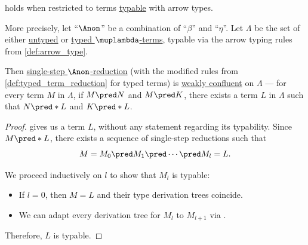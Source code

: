 \begin{proposition}\label{thm:simply_typed_church_rosser_theorem}
   holds when restricted to terms \hyperref[def:typability]{typable} with arrow types.

  More precisely, let \enquote{\( {\Anon} \)} be a combination of \enquote{\( \beta \)} and \enquote{\( \eta \)}. Let \( \Lambda \) be the set of either \hyperref[def:lambda_term]{untyped} or \hyperref[def:typed_lambda_term]{typed \( \muplambda \)-terms}, typable via the arrow typing rules from \cref{def:arrow_type}.

  Then \hyperref[def:lambda_term_reduction/single]{single-step \( \Anon \)-reduction} (with the modified rules from \cref{def:typed_term_reduction} for typed terms) is \hyperref[def:reduction_confluence]{weakly confluent} on \( \Lambda \) --- for every term \( M \) in \( \Lambda \), if \( M \pred N \) and \( M \pred K \), there exists a term \( L \) in \( \Lambda \) such that \( N \pred* L \) and \( K \pred* L \).
\end{proposition}
\begin{proof}
   gives us a term \( L \), without any statement regarding its typability. Since \( M \pred* L \), there exists a sequence of single-step reductions such that
  \begin{equation*}
    M = M_0 \pred M_1 \pred \cdots \pred M_l = L.
  \end{equation*}

  We proceed inductively on \( l \) to show that \( M_l \) is typable:
  \begin{itemize}
    \item If \( l = 0 \), then \( M = L \) and their type derivation trees coincide.
    \item We can adapt every derivation tree for \( M_l \) to \( M_{l+1} \) via .
  \end{itemize}

  Therefore, \( L \) is typable.
\end{proof}
